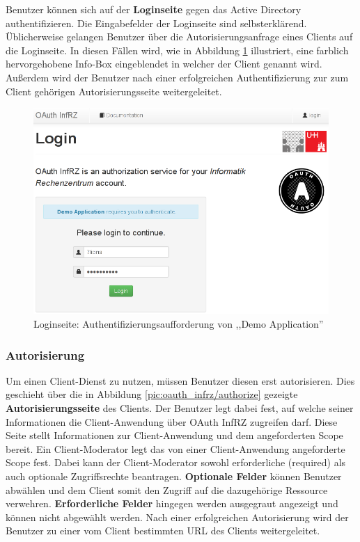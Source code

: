 \documentclass[12pt,a4paper,pointednumbers,abstracton]{scrartcl}
\begin{document}
Benutzer können sich auf der \textbf{Loginseite} gegen das Active Directory authentifizieren.
Die Eingabefelder der Loginseite sind selbsterklärend.
Üblicherweise gelangen Benutzer über die Autorisierungsanfrage eines Clients auf die Loginseite.
In diesen Fällen wird, wie in Abbildung \ref{pic:oauth_infrz/login_client} illustriert, eine farblich hervorgehobene Info-Box eingeblendet in welcher der Client genannt wird.
Außerdem wird der Benutzer nach einer erfolgreichen Authentifizierung zur zum Client gehörigen Autorisierungsseite weitergeleitet.

\begin{figure}[h!]
\centering
\includegraphics[width=15cm]{img/oauth_infrz/login_client}
\caption{Loginseite: Authentifizierungsaufforderung von ,,Demo Application''}
\label{pic:oauth_infrz/login_client}
\end{figure}

\subsubsection{Autorisierung}

Um einen Client-Dienst zu nutzen, müssen Benutzer diesen erst autorisieren.
Dies geschieht über die in Abbildung \ref{pic:oauth_infrz/authorize} gezeigte \textbf{Autorisierungsseite} des Clients.
Der Benutzer legt dabei fest, auf welche seiner Informationen die Client-Anwendung über OAuth InfRZ zugreifen darf.
Diese Seite stellt Informationen zur Client-Anwendung und dem angeforderten Scope bereit.
Ein Client-Moderator legt das von einer Client-Anwendung angeforderte Scope fest.
Dabei kann der Client-Moderator sowohl erforderliche (required) als auch optionale Zugriffsrechte beantragen.
\textbf{Optionale Felder} können Benutzer abwählen und dem Client somit den Zugriff auf die dazugehörige Ressource verwehren.
\textbf{Erforderliche Felder} hingegen werden ausgegraut angezeigt und können nicht abgewählt werden.
Nach einer erfolgreichen Autorisierung wird der Benutzer zu einer vom Client bestimmten URL des Clients weitergeleitet.
\end{document}
